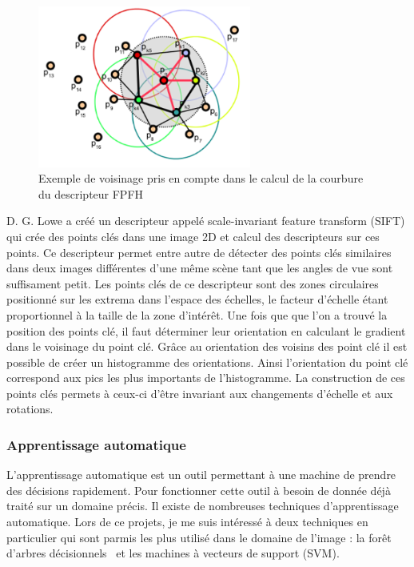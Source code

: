\begin{figure}[!ht]
  \begin{center}
    \includegraphics[width=7cm]{image/FPFH.png}
    \caption{Exemple de voisinage pris en compte dans le calcul de la courbure du descripteur FPFH}
    \label{fig:fpfhNeighborhood}
  \end{center}
\end{figure}

D. G. Lowe\cite{SIFT} a créé un descripteur appelé \og scale-invariant feature transform \fg(SIFT) qui crée
des points clés dans une image 2D et calcul des descripteurs sur ces points. Ce descripteur permet entre autre
de détecter des points clés similaires dans deux images différentes d'une même scène tant que les angles de vue
sont suffisament petit. Les points clés de ce descripteur sont des zones circulaires positionné sur les extrema 
dans l'espace des échelles, le facteur d'échelle étant proportionnel à la taille de la zone d'intérêt. Une fois que
que l'on a trouvé la position des points clé, il faut déterminer leur orientation en calculant le gradient dans le voisinage
du point clé. Grâce au orientation des voisins des point clé il est possible de créer un histogramme des orientations. Ainsi
l'orientation du point clé correspond aux pics les plus importants de l'histogramme.
La construction de ces points clés permets à ceux-ci d'être invariant aux changements d'échelle et aux rotations.

\subsubsection{Apprentissage automatique}
L'apprentissage automatique est un outil permettant à une machine de prendre des décisions rapidement.
Pour fonctionner cette outil à besoin de donnée déjà traité sur un domaine précis. Il existe de nombreuses
techniques d'apprentissage automatique. Lors de ce projets, je me suis intéressé à deux techniques en 
particulier qui sont parmis les plus utilisé dans le domaine de l'image : la \og forêt d'arbres décisionnels \fg \ et les
\og machines à vecteurs de support \fg (SVM).\\


